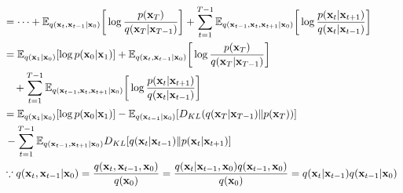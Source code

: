 \begin{align}
		&= \dots + \mathbb{E}_{q({\mathbf{x}}_{t}, {\mathbf{x}}_{t-1}|{\mathbf{x}}_0)}\bigg[\log \frac{p({\mathbf{x}}_T)}{q({\mathbf{x}}_T|{\mathbf{x}}_{T-1})}\bigg] + \sum_{t=1}^{T-1}\mathbb{E}_{q({\mathbf{x}}_{t-1},{\mathbf{x}}_t,{\mathbf{x}}_{t+1}|{\mathbf{x}}_0)}\bigg[\log \frac{ p({\mathbf{x}}_{t}|{\mathbf{x}}_{t+1})}{q({\mathbf{x}}_{t}|{\mathbf{x}}_{t-1})}\bigg]\\
		&= \mathbb{E}_{q({\mathbf{x}}_{1}|{\mathbf{x}}_0)}[\log p({\mathbf{x}}_0|{\mathbf{x}}_{1})] + \mathbb{E}_{q({\mathbf{x}}_{t}, {\mathbf{x}}_{t-1}|{\mathbf{x}}_0)}\bigg[\log \frac{p({\mathbf{x}}_T)}{q({\mathbf{x}}_T|{\mathbf{x}}_{T-1})}\bigg]\\ 
		&\quad+ \sum_{t=1}^{T-1}\mathbb{E}_{q({\mathbf{x}}_{t-1},{\mathbf{x}}_t,{\mathbf{x}}_{t+1}|{\mathbf{x}}_0)}\bigg[\log \frac{ p({\mathbf{x}}_{t}|{\mathbf{x}}_{t+1})}{q({\mathbf{x}}_{t}|{\mathbf{x}}_{t-1})}\bigg]\\
		&= \mathbb{E}_{q({\mathbf{x}}_{1}|{\mathbf{x}}_0)}[\log p({\mathbf{x}}_0|{\mathbf{x}}_{1})] - \mathbb{E}_{q({\mathbf{x}}_{t-1}|{\mathbf{x}}_0)}[D_{KL}(q({\mathbf{x}}_T|{\mathbf{x}}_{T-1})\| p({\mathbf{x}}_T))]\\
		&\,- \sum_{t=1}^{T-1}\mathbb{E}_{q({\mathbf{x}}_{t-1},{\mathbf{x}}_{t+1}|{\mathbf{x}}_0)}D_{KL}[q({\mathbf{x}}_{t}|{\mathbf{x}}_{t-1})\|p({\mathbf{x}}_{t}|{\mathbf{x}}_{t+1})]\\
		& \because q({\mathbf{x}}_{t}, {\mathbf{x}}_{t-1}|{\mathbf{x}}_0) = \frac{q({\mathbf{x}}_{t}, {\mathbf{x}}_{t-1},{\mathbf{x}}_0)}{q({\mathbf{x}}_0)} = \frac{q({\mathbf{x}}_{t}|{\mathbf{x}}_{t-1}, {\mathbf{x}}_0)q({\mathbf{x}}_{t-1}, {\mathbf{x}}_0)}{q({\mathbf{x}}_0)} = q({\mathbf{x}}_{t}|{\mathbf{x}}_{t-1})q({\mathbf{x}}_{t-1}|{\mathbf{x}}_0)
	\label{eq:diffusion_mle}
\end{align}
